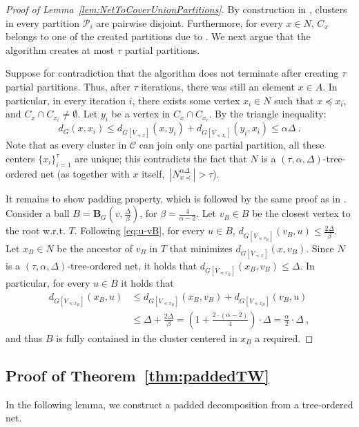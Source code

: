 \documentclass{article}
\def\cP{\ensuremath{\mathcal{P}}}
\def\ball{\mathbf{B}}
\def\cC{\ensuremath{\mathcal{C}}}
\begin{document}
\begin{proof}[Proof of Lemma~\ref{lem:NetToCoverUnionPartitions}]
	By construction in , clusters in every partition $\cP_i$ are pairwise disjoint. Furthermore, for every $x\in N$, $C_x$ belongs to one of the created partitions due to .  We next argue that the algorithm creates at most $\tau$ partial partitions.
	
	Suppose for contradiction that the algorithm does not terminate after creating  $\tau$ partial partitions. Thus, after $\tau$ iterations, there was still an element $x\in A$. In particular, in every iteration $i$, there exists some vertex $x_i \in N$ such that $x\preceq x_i$, and $C_x\cap C_{x_i}\not=\emptyset$. 
	Let $y_i$ be  a vertex in $C_x\cap C_{x_i}$.  By the triangle inequality:
	\begin{equation*}
		d_{G}(x,x_{i})\le d_{G[V_{\preceq x}]}(x,y_{i})+d_{G[V_{\preceq x_{i}}]}(y_{i},x_{i})\le\alpha\Delta~.
	\end{equation*}
	Note that as every cluster in $\cC$ can join only one partial partition, all these centers $\{x_i\}_{i=1}^{\tau}$ are unique; this contradicts the fact that $N$ is a $(\tau,\alpha,\Delta)$-tree-ordered net (as together with $x$ itself,~$\left|N_{x\preceq}^{\alpha\Delta}\right|>\tau$). 
	
	It remains to show padding property, which is followed by the same proof as in .
	Consider a ball $B=\ball_G(v,\frac{\Delta}{\beta})$, for $\beta=\frac{4}{\alpha-2}$. Let $v_B\in B$ be the closest vertex to the root w.r.t. $T$. Following \cref{eq:u-vB},  for every $u\in B$, $d_{G[V_{\preceq v_B}]}(v_B,u)\le \frac{2\Delta}{\beta}$.
	Let $x_B\in N$ be the ancestor of $v_B$ in $T$ that minimizes $d_{G[V_{\preceq x}]}(x,v_B)$. Since $N$ is a $(\tau,\alpha,\Delta)$-tree-ordered net, it holds that $d_{G[V_{\preceq x_B}]}(x_B,v_B)\le\Delta$. In particular, for every $u\in B$ it holds that 
	\begin{align*}
		d_{G[V_{\preceq x_{B}}]}(x_{B},u) & \le d_{G[V_{\preceq x_{B}}]}(x_{B},v_{B})+d_{G[V_{\preceq x_{B}}]}(v_{B},u)\\
		& \le\Delta+\frac{2\Delta}{\beta}=\left(1+\frac{2\cdot(\alpha-2)}{4}\right)\cdot\Delta=\frac{\alpha}{2}\cdot\Delta~,
	\end{align*}
	and thus $B$ is fully contained in the cluster centered in $x_B$ a required.
\end{proof}




\subsection{Proof of Theorem~\ref{thm:paddedTW}}
In the following lemma, we construct a padded decomposition from a tree-ordered net. 
\end{document}
